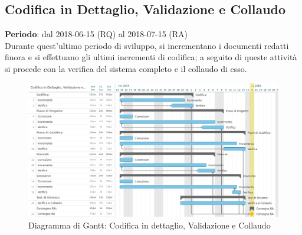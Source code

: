 \subsection{Codifica in Dettaglio, Validazione e Collaudo}
\textbf{Periodo}: dal 2018-06-15 (RQ) al 2018-07-15 (RA)\\

Durante quest'ultimo periodo di sviluppo, si incrementano i documenti redatti finora e si effettuano gli ultimi incrementi di codifica; a seguito di queste attività si procede con la verifica del sistema completo e il collaudo di esso.

\begin{figure}[h!]
	\centerline{\includegraphics[scale=0.5]{img/DiagrammiGantt/CodificaValidazioneCollaudo.jpg}}
	\caption{Diagramma di Gantt: Codifica in dettaglio, Validazione e Collaudo}
	\label{fig:gantt_cod_valid_coll}
\end{figure}
\clearpage
